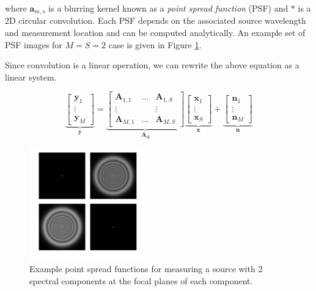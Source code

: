 \documentclass{article}
\begin{document}
where $\bm{a}_{m,s}$ is a blurring kernel known as a \emph{point spread
function} (PSF) and $\ast$ is a 2D circular convolution. Each PSF depends on the
associated source wavelength and measurement location and can be computed
analytically. An example set of PSF images for $M=S=2$ case is given in Figure
\ref{fig:psfs}.


Since convolution is a linear operation, we can rewrite the above equation as a
linear system.

\begin{equation}
  \underbrace{
    \begin{bmatrix}\bm{y}_1 \\ \vdots \\ \bm{y}_M\end{bmatrix}
  }_{\bm{y}}
  =
  \underbrace{
    \begin{bmatrix}
      \bm{A}_{1, 1} & \hdots & \bm{A}_{1, S} \\
      \vdots & & \vdots \\
      \bm{A}_{M, 1} & \hdots & \bm{A}_{M, S}
    \end{bmatrix}
  }_{\bm{A}_{\bm{d}}}
  \underbrace{
    \begin{bmatrix}\bm{x}_1 \\ \vdots \\ \bm{x}_S\end{bmatrix}
  }_{\bm{x}}
  +
  \underbrace{
    \begin{bmatrix}\bm{n}_1 \\ \vdots \\ \bm{n}_M\end{bmatrix}
  }_{\bm{n}}
\label{eq:fourier_mtx}
\end{equation}

\begin{figure}[htb]
  \begin{minipage}[b]{1\linewidth}
    \centering
    \centerline{\includegraphics[width=5cm]{psfs}}
  \end{minipage}
  \caption{Example point spread functions for measuring a source with 2 spectral
    components at the focal planes of each component.}
  \label{fig:psfs}
\end{figure}
\end{document}
